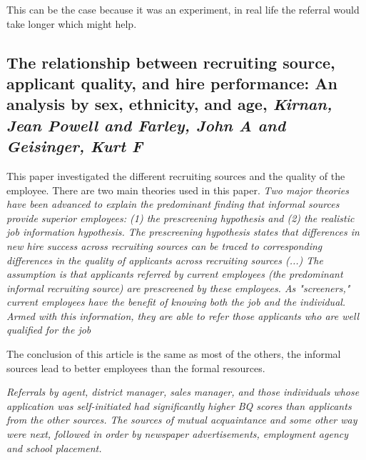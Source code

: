 \documentclass[a4paper, 11pt]{article} %
\begin{document}
This can be the case because it was an experiment, in real life the referral would take longer which might help.


\subsection*{The relationship between recruiting source, applicant quality, and hire performance: An analysis by sex, ethnicity, and age, 
\emph{Kirnan, Jean Powell and Farley, John A and Geisinger, Kurt F} \cite{tenth}}

This paper investigated the different recruiting sources and the quality of the employee. 
There are two main theories used in this paper.
\emph{Two major theories have been advanced to explain the predominant
finding that informal sources provide superior employees: (1) the prescreening hypothesis and (2) the realistic job information hypothesis. The
prescreening hypothesis states that differences in new hire success across
recruiting sources can be traced to corresponding differences in the quality
of applicants across recruiting sources (...) The assumption is that applicants referred by current employees (the predominant informal recruiting source) are prescreened by these
employees. As "screeners," current employees have the benefit of knowing
both the job and the individual. Armed with this information, they are able
to refer those applicants who are well qualified for the job}

The conclusion of this article is the same as most of the others, the informal sources lead to better employees than the formal resources.

\emph{Referrals by agent, district manager, sales manager,
and those individuals whose application was self-initiated had significantly
higher BQ scores than applicants from the other sources. The sources
of mutual acquaintance and some other way were next, followed in order
by newspaper advertisements, employment agency and school placement.}
\end{document}
